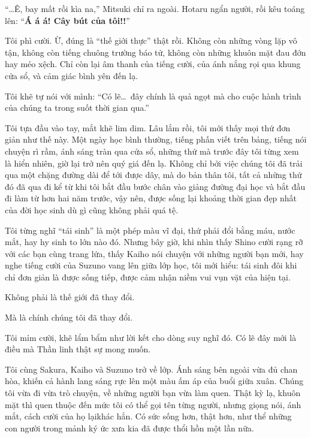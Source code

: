 \documentclass[../main.tex]{subfiles}
\begin{document}
``\dots Ê, bay mất rồi kìa na,'' Mitsuki chỉ ra ngoài. Hotaru ngẩn người, rồi kêu toáng lên: ``\textbf{Á á á! Cây bút của tôi!!}''

Tôi phì cười. Ừ, đúng là ``thế giới thực'' thật rồi. Không còn những vòng lặp vô tận, không còn tiếng chuông trường báo tử, không còn những khuôn mặt đau đớn hay méo xệch. Chỉ còn lại âm thanh của tiếng cười, của ánh nắng rọi qua khung cửa sổ, và cảm giác bình yên đến lạ.

Tôi khẽ tự nói với mình: ``Có lẽ\dots\ đây chính là quả ngọt mà cho cuộc hành trình của chúng ta trong suốt thời gian qua.''

Tôi tựa đầu vào tay, mắt khẽ lim dim. Lâu lắm rồi, tôi mới thấy mọi thứ đơn giản như thế này. Một ngày học bình thường, tiếng phấn viết trên bảng, tiếng nói chuyện rì rầm, ánh sáng tràn qua cửa sổ, những thứ mà trước đây tôi từng xem là hiển nhiên, giờ lại trở nên quý giá đến lạ. Không chỉ bởi việc chúng tôi đã trải qua một chặng đường dài để tới được dây, mà do bản thân tôi, tất cả những thứ đó đã qua đi kể từ khi tôi bắt đầu bước chân vào giảng đường đại học và bắt đầu đi làm từ hơn hai năm trước, vậy nên, được sống lại khoảng thời gian đẹp nhất của đời học sinh dù gì cũng không phải quá tệ.

Tôi từng nghĩ ``tái sinh'' là một phép màu vĩ đại, thứ phải đổi bằng máu, nước mắt, hay hy sinh to lớn nào đó. Nhưng bây giờ, khi nhìn thấy Shino cười rạng rỡ với các bạn cùng trang lứa, thấy Kaiho nói chuyện với những người bạn mới, hay nghe tiếng cười của Suzuno vang lên giữa lớp học, tôi mới hiểu: tái sinh đôi khi chỉ đơn giản là được sống tiếp, được cảm nhận niềm vui vụn vặt của hiện tại.

Không phải là thế giới đã thay đổi.

Mà là chính chúng tôi đã thay đổi.

Tôi mỉm cười, khẽ lẩm bẩm như lời kết cho dòng suy nghĩ đó. Có lẽ đây mới là điều mà Thần linh thật sự mong muốn.

\ct


Tôi cùng Sakura, Kaiho và Suzuno trở về lớp. Ánh sáng bên ngoài vừa đủ chan hòa, khiến cả hành lang sáng rực lên một màu ấm áp của buổi giữa xuân. Chúng tôi vừa đi vừa trò chuyện, về những người bạn vừa làm quen. Thật kỳ lạ, khuôn mặt thì quen thuộc đến mức tôi có thể gọi tên từng người, nhưng giọng nói, ánh mắt, cách cười của họ lạikhác hẳn. Có sức sống hơn, thật hơn, như thể những con người trong mảnh ký ức xưa kia đã được thổi hồn một lần nữa.
\end{document}
